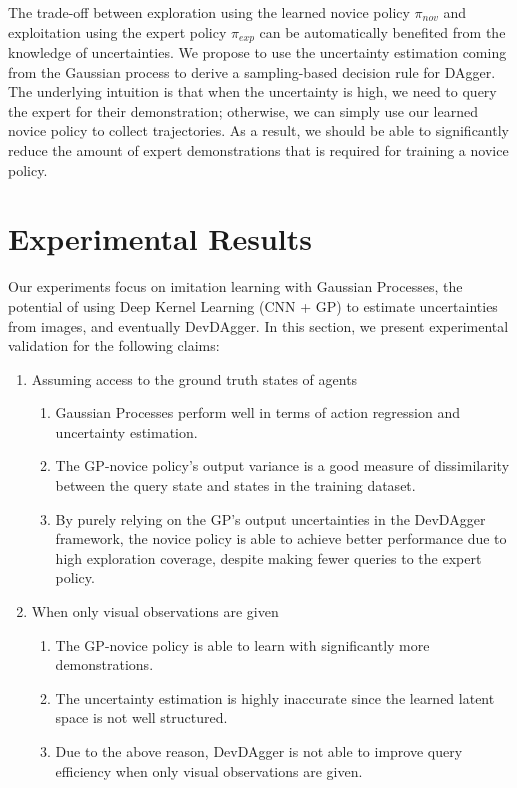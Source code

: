 \documentclass[11pt, reqno, letterpaper, twoside]{amsart}
\begin{document}
The trade-off between exploration using the learned novice policy $\pi_{nov}$ and exploitation using the expert policy $\pi_{exp}$ can be automatically benefited from the knowledge of uncertainties. We propose to use the uncertainty estimation coming from the Gaussian process to derive a sampling-based decision rule for DAgger. The underlying intuition is that when the uncertainty is high, we need to query the expert for their demonstration; otherwise, we can simply use our learned novice policy to collect trajectories. As a result, we should be able to significantly reduce the amount of expert demonstrations that is required for training a novice policy.


\section{Experimental Results}
Our experiments focus on imitation learning with Gaussian Processes, the potential of using Deep Kernel Learning (CNN + GP) to estimate uncertainties from images, and eventually DevDAgger. In this section, we present experimental validation for the following claims:
\begin{enumerate}
	\item Assuming access to the ground truth states of agents
	      \begin{enumerate}
		      \item Gaussian Processes perform well in terms of action regression and uncertainty estimation.
		      \item The GP-novice policy’s output variance is a good measure of dissimilarity between the query state and states in the training dataset.
		      \item By purely relying on the GP's output uncertainties in the DevDAgger framework, the novice policy is able to achieve better performance due to high exploration coverage, despite making fewer queries to the expert policy.
	      \end{enumerate}

	\item When only visual observations are given
	      \begin{enumerate}
		      \item The GP-novice policy is able to learn with significantly more demonstrations.
		      \item The uncertainty estimation is highly inaccurate since the learned latent space is not well structured.
		      \item Due to the above reason, DevDAgger is not able to improve query efficiency when only visual observations are given.
	      \end{enumerate}
\end{enumerate}
\end{document}
